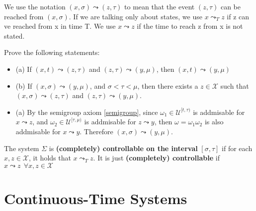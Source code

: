 We use the notation $(x,\sigma)\leadsto(z,\tau)$ to mean that the event $(z,\tau)$ can be reached from $(x,\sigma)$. If we are talking only about states, we use $x\leadsto_{T}z$ if z can ve reached from x in time T. We use $x\leadsto z$ if the time to reach z from x is not stated.

\begin{leftbar}
\begin{lem}[Excercise] Prove the following statements:

    \begin{itemize}
    
        \item (a) If $(x,t)\leadsto(z,\tau)$ and $(z,\tau)\leadsto(y,\mu)$, then $(x,t)\leadsto(y,\mu)$
        
        \item (b) If $(x,\sigma)\leadsto(y,\mu)$, and $\sigma<\tau<\mu$, then there exists a $z\in\mathcal{X}$ such that $(x,\sigma)\leadsto(z,\tau)$ and $(z,\tau)\leadsto(y,\mu)$.
        
    \end{itemize}
\end{lem}
\end{leftbar}


\begin{soln}
    \begin{itemize}
    
        \item (a) By the semigroup axiom \ref{semigroup}, since $\omega_{1}\in\mathcal{U}^{[t,\tau)}$ is addmisable for $x\leadsto z$, and $\omega_{2}\in\mathcal{U}^{[\tau,\mu)}$ is addmisable for $z\leadsto y$, then $\omega=\omega_{1}\omega_{2}$ is also addmisable for $x\leadsto y$. Therefore $(x,\sigma)\leadsto(y,\mu)$. 
      
    \end{itemize}
\end{soln}

\begin{leftbar}
\begin{define}
    The system $\Sigma$ is \textbf{(completely) controllable on the interval} $[\sigma,\tau]$ if for each $x,z\in\mathcal{X}$, it holds that $x\leadsto_{T}z$. It is just \textbf{(completely) controllable} if $x\leadsto z \ \ \forall x,z\in\mathcal{X}$
    
\end{define}
\end{leftbar}


\section{Continuous-Time Systems}

